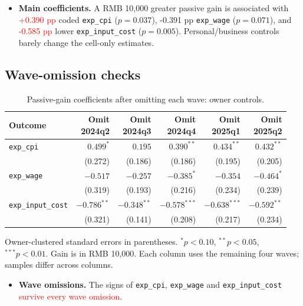 \documentclass[11pt,letterpaper,english,final]{article}
\begin{document}
\begin{itemize}
\item \textbf{Main coefficients.} A RMB 10,000 greater passive gain is associated with \textcolor{red}{+0.390 pp} coded \texttt{exp\_cpi} ($p=0.037$), -0.391 pp \texttt{exp\_wage} ($p=0.071$), and \textcolor{red}{-0.585 pp} lower \texttt{exp\_input\_cost} ($p=0.005$). Personal/business controls barely change the cell-only estimates.


\end{itemize}

\subsection{Wave-omission checks}

\begin{table}[H]
\centering\small
\setlength{\tabcolsep}{5pt}
\caption{Passive-gain coefficients after omitting each wave: owner controls.}
\begin{tabular}{lrrrrr}
\toprule
Outcome & \shortstack{Omit\\2024q2} & \shortstack{Omit\\2024q3} & \shortstack{Omit\\2024q4} & \shortstack{Omit\\2025q1} & \shortstack{Omit\\2025q2} \\
\midrule
\texttt{exp\_cpi} & $\bm{0.499}^{*}$ & $0.195$ & $\bm{0.390}^{**}$ & $\bm{0.434}^{**}$ & $\bm{0.432}^{**}$ \\
 & (0.272) & (0.186) & (0.186) & (0.195) & (0.205) \\[3pt]
\texttt{exp\_wage} & $-0.517$ & $-0.257$ & $\bm{-0.385}^{*}$ & $-0.354$ & $\bm{-0.464}^{*}$ \\
 & (0.319) & (0.193) & (0.216) & (0.234) & (0.239) \\[3pt]
\texttt{exp\_input\_cost} & $\bm{-0.786}^{**}$ & $\bm{-0.348}^{**}$ & $\bm{-0.578}^{***}$ & $\bm{-0.638}^{***}$ & $\bm{-0.592}^{**}$ \\
 & (0.321) & (0.141) & (0.208) & (0.217) & (0.234) \\[3pt]
\bottomrule
\end{tabular}
\par\vspace{4pt}\begin{minipage}{\linewidth}\footnotesize Owner-clustered standard errors in parentheses. $^{*}p<0.10$, $^{**}p<0.05$, $^{***}p<0.01$. Gain is in RMB 10,000. Each column uses the remaining four waves; samples differ across columns.\end{minipage}
\end{table}
\begin{itemize}
\item \textbf{Wave omissions.} The signs of \texttt{exp\_cpi}, \texttt{exp\_wage} and \texttt{exp\_input\_cost} \textcolor{red}{survive every wave omission}.
\end{itemize}
\end{document}
